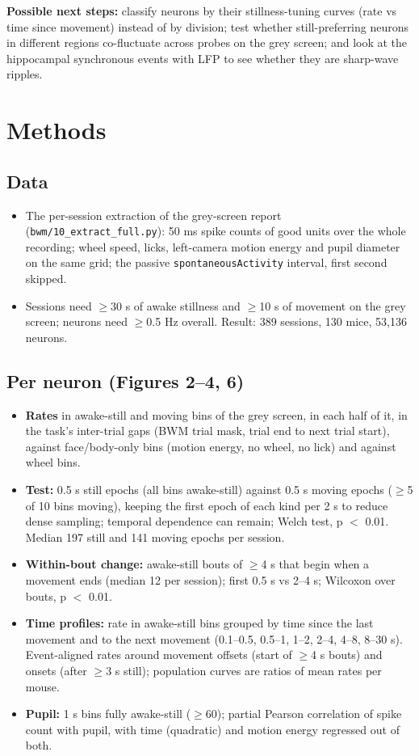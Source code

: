 \documentclass[10pt,a4paper]{article}
\begin{document}
\textbf{Possible next steps:} classify neurons by their stillness-tuning curves (rate vs time since movement) instead of by division; test whether still-preferring neurons in different regions co-fluctuate across probes on the grey screen; and look at the hippocampal synchronous events with LFP to see whether they are sharp-wave ripples.

\section{Methods}
\subsection{Data}
\begin{itemize}
\item The per-session extraction of the grey-screen report (\texttt{bwm/\allowbreak{}10\_\allowbreak{}extract\_\allowbreak{}full.py}): 50 ms spike counts of good units over the whole recording; wheel speed, licks, left-camera motion energy and pupil diameter on the same grid; the passive \texttt{spontaneousActivity} interval, first second skipped.
\item Sessions need $\geq$30 s of awake stillness and $\geq$10 s of movement on the grey screen; neurons need $\geq$0.5 Hz overall. Result: 389 sessions, 130 mice, 53,136 neurons.
\end{itemize}
\subsection{Per neuron (Figures 2--4, 6)}
\begin{itemize}
\item \textbf{Rates} in awake-still and moving bins of the grey screen, in each half of it, in the task's inter-trial gaps (BWM trial mask, trial end to next trial start), against face/body-only bins (motion energy, no wheel, no lick) and against wheel bins.
\item \textbf{Test:} 0.5 s still epochs (all bins awake-still) against 0.5 s moving epochs ($\geq$5 of 10 bins moving), keeping the first epoch of each kind per 2 s to reduce dense sampling; temporal dependence can remain; Welch test, p $<$ 0.01. Median 197 still and 141 moving epochs per session.
\item \textbf{Within-bout change:} awake-still bouts of $\geq$4 s that begin when a movement ends (median 12 per session); first 0.5 s vs 2--4 s; Wilcoxon over bouts, p $<$ 0.01.
\item \textbf{Time profiles:} rate in awake-still bins grouped by time since the last movement and to the next movement (0.1--0.5, 0.5--1, 1--2, 2--4, 4--8, 8--30 s). Event-aligned rates around movement offsets (start of $\geq$4 s bouts) and onsets (after $\geq$3 s still); population curves are ratios of mean rates per mouse.
\item \textbf{Pupil:} 1 s bins fully awake-still ($\geq$60); partial Pearson correlation of spike count with pupil, with time (quadratic) and motion energy regressed out of both.
\end{itemize}
\end{document}
